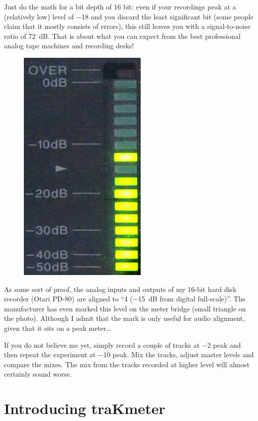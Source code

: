 Just do the math for a bit depth of 16 bit: even if your recordings
peak at a (relatively low) level of \SI{-18}{\dBFS} and you discard
the least significant bit (some people claim that it mostly consists
of errors), this still leaves you with a signal-to-noise ratio of
\SI{72}{\dB}.  That is about what you can expect from the best
professional analog tape machines and recording desks!

\begin{figure}
  \includegraphics[scale=0.24,clip]{include/images/otari_meter.png}
\end{figure}

As some sort of proof, the analog inputs and outputs of my 16-bit hard
disk recorder (Otari PD-80) are aligned to
``\SI[addsign=all]{+4}{\dBu} (\SI{-15}{\dB} from digital
full-scale)''.  The manufacturer has even marked this level on the
meter bridge (small triangle on the photo).  Although I admit that the
mark is only useful for audio alignment, given that it sits on a peak
meter\ldots

If you do not believe me yet, simply record a couple of tracks at
\SI{-2}{\dBFS} peak and then repeat the experiment at \SI{-10}{\dBFS}
peak.  Mix the tracks, adjust master levels and compare the mixes.
The mix from the tracks recorded at higher level will almost certainly
sound worse.

\section{Introducing traKmeter}
\label{sec:introducing_trakmeter}

